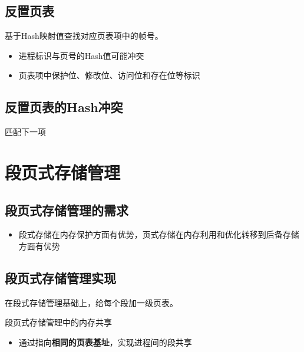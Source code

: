 \subsection{反置页表}
基于Hash映射值查找对应页表项中的帧号。
\begin{itemize}
	\item 进程标识与页号的Hash值可能冲突
	\item 页表项中保护位、修改位、访问位和存在位等标识
\end{itemize}
\subsection{反置页表的Hash冲突}
匹配下一项
\section{段页式存储管理}
\subsection{段页式存储管理的需求}
\begin{itemize}
	\item 段式存储在内存保护方面有优势，页式存储在内存利用和优化转移到后备存储方面有优势
\end{itemize}
\subsection{段页式存储管理实现}
在段式存储管理基础上，给每个段加一级页表。
\par 段页式存储管理中的内存共享
\begin{itemize}
	\item 通过指向\textbf{相同的页表基址}，实现进程间的段共享
\end{itemize}

